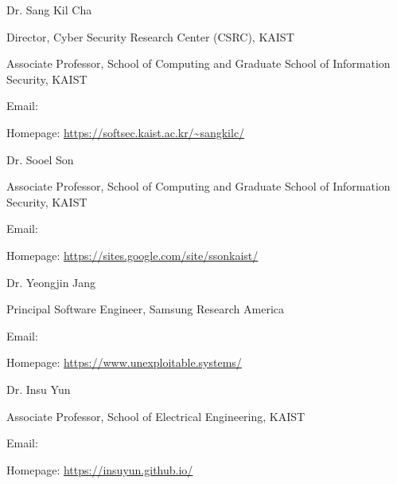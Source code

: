 \begin{timeitemize}{Dr. Sang Kil Cha}{}
    \item Director, Cyber Security Research Center (CSRC), KAIST
    \item Associate Professor, School of Computing and Graduate School of Information Security, KAIST
    \item Email: 
    \item Homepage: \url{https://softsec.kaist.ac.kr/~sangkilc/}
\end{timeitemize}

\begin{timeitemize}{Dr. Sooel Son}{}
    \item Associate Professor, School of Computing and Graduate School of Information Security, KAIST
    \item Email: 
    \item Homepage: \url{https://sites.google.com/site/ssonkaist/}
\end{timeitemize}

\begin{timeitemize}{Dr. Yeongjin Jang}{}
    \item Principal Software Engineer, Samsung Research America
    \item Email: 
    \item Homepage: \url{https://www.unexploitable.systems/}
\end{timeitemize}

\begin{timeitemize}{Dr. Insu Yun}{}
    \item Associate Professor, School of Electrical Engineering, KAIST
    \item Email: 
    \item Homepage: \url{https://insuyun.github.io/}
\end{timeitemize}
